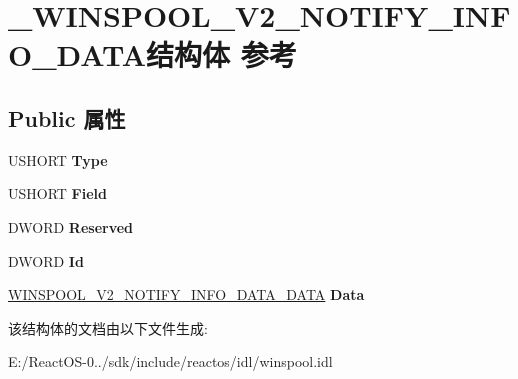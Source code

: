 \hypertarget{struct___w_i_n_s_p_o_o_l___v2___n_o_t_i_f_y___i_n_f_o___d_a_t_a}{}\section{\+\_\+\+W\+I\+N\+S\+P\+O\+O\+L\+\_\+\+V2\+\_\+\+N\+O\+T\+I\+F\+Y\+\_\+\+I\+N\+F\+O\+\_\+\+D\+A\+T\+A结构体 参考}
\label{struct___w_i_n_s_p_o_o_l___v2___n_o_t_i_f_y___i_n_f_o___d_a_t_a}
\subsection*{Public 属性}
\begin{DoxyCompactItemize}
\item 
\mbox{\label{struct___w_i_n_s_p_o_o_l___v2___n_o_t_i_f_y___i_n_f_o___d_a_t_a_a1aab60692a32eb6ef4a3b6c2425ad7eb}} 
U\+S\+H\+O\+RT {\bfseries Type}
\item 
\mbox{\label{struct___w_i_n_s_p_o_o_l___v2___n_o_t_i_f_y___i_n_f_o___d_a_t_a_af6f524afd1267db6a3aa5283102eb3a3}} 
U\+S\+H\+O\+RT {\bfseries Field}
\item 
\mbox{\label{struct___w_i_n_s_p_o_o_l___v2___n_o_t_i_f_y___i_n_f_o___d_a_t_a_aa95fdbe2d4c157c2a3213953464abbfa}} 
D\+W\+O\+RD {\bfseries Reserved}
\item 
\mbox{\label{struct___w_i_n_s_p_o_o_l___v2___n_o_t_i_f_y___i_n_f_o___d_a_t_a_a43e8256d7d4e33bd58ecb5225fe4aa5b}} 
D\+W\+O\+RD {\bfseries Id}
\item 
\mbox{\label{struct___w_i_n_s_p_o_o_l___v2___n_o_t_i_f_y___i_n_f_o___d_a_t_a_a4b9747cf24b6f1639671cc0b6548fd0c}} 
\hyperlink{union___w_i_n_s_p_o_o_l___v2___n_o_t_i_f_y___i_n_f_o___d_a_t_a___d_a_t_a}{W\+I\+N\+S\+P\+O\+O\+L\+\_\+\+V2\+\_\+\+N\+O\+T\+I\+F\+Y\+\_\+\+I\+N\+F\+O\+\_\+\+D\+A\+T\+A\+\_\+\+D\+A\+TA} {\bfseries Data}
\end{DoxyCompactItemize}


该结构体的文档由以下文件生成\+:\begin{DoxyCompactItemize}
\item 
E\+:/\+React\+O\+S-\/0../sdk/include/reactos/idl/winspool.\+idl\end{DoxyCompactItemize}
